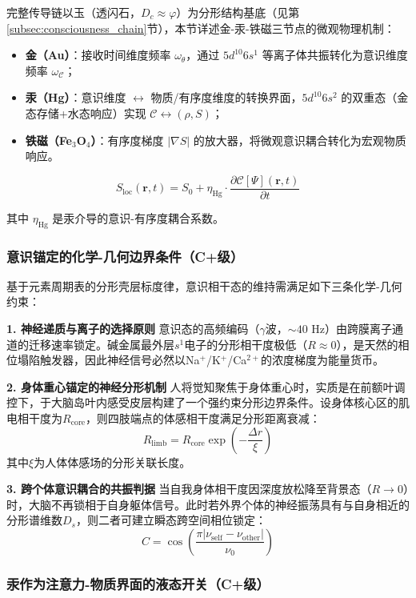 \documentclass[12pt,a4paper,twocolumn]{article}
\renewcommand{\phi}{\varphi}
\begin{document}
完整传导链以玉（透闪石，$D_c\approx\phi$）为分形结构基底（见第\ref{subsec:consciousness_chain}节），本节详述金-汞-铁磁三节点的微观物理机制：

\begin{itemize}
\item \textbf{金（Au）}：接收时间维度频率 $\omega_\theta$，通过 $5d^{10}6s^1$ 等离子体共振转化为意识维度频率 $\omega_{\mathcal{C}}$；
\item \textbf{汞（Hg）}：意识维度 $\leftrightarrow$ 物质/有序度维度的转换界面，$5d^{10}6s^2$ 的双重态（金态存储+水态响应）实现 $\mathcal{C} \leftrightarrow (\rho, S)$；
\item \textbf{铁磁（Fe$_3$O$_4$）}：有序度梯度 $|\nabla S|$ 的放大器，将微观意识耦合转化为宏观物质响应。
\end{itemize}

\begin{equation}
S_{\text{loc}}(\mathbf{r}, t) = S_0 + \eta_{\text{Hg}} \cdot \frac{\partial \mathcal{C}[\Psi](\mathbf{r}, t)}{\partial t}
\end{equation}

其中 $\eta_{\text{Hg}}$ 是汞介导的意识-有序度耦合系数。

\subsubsection{意识锚定的化学-几何边界条件（C+级）}
基于元素周期表的分形壳层标度律，意识相干态的维持需满足如下三条化学-几何约束：

\textbf{1. 神经递质与离子的选择原则}
意识态的高频编码（$\gamma$波，$\sim40$ Hz）由跨膜离子通道的迁移速率锁定。碱金属最外层$s^1$电子的分形相干度极低（$R\approx0$），是天然的相位塌陷触发器，因此神经信号必然以Na$^+$/K$^+$/Ca$^{2+}$的浓度梯度为能量货币。

\textbf{2. 身体重心锚定的神经分形机制}
人将觉知聚焦于身体重心时，实质是在前额叶调控下，于大脑岛叶内感受皮层构建了一个强约束分形边界条件。设身体核心区的肌电相干度为$R_{\text{core}}$，则四肢端点的体感相干度满足分形距离衰减：
\[
R_{\text{limb}} = R_{\text{core}} \exp\left(-\frac{\Delta r}{\xi}\right)
\]
其中$\xi$为人体体感场的分形关联长度。

\textbf{3. 跨个体意识耦合的共振判据}
当自我身体相干度因深度放松降至背景态（$R\to0$）时，大脑不再锁相于自身躯体信号。此时若外界个体的神经振荡具有与自身相近的分形谱维数$D_s$，则二者可建立瞬态跨空间相位锁定：
\[
C = \cos\left( \frac{\pi |\nu_{\text{self}}-\nu_{\text{other}}|}{\nu_0} \right)
\]

\subsubsection{汞作为注意力-物质界面的液态开关（C+级）}
\label{sec:mercury_interface}
\end{document}

